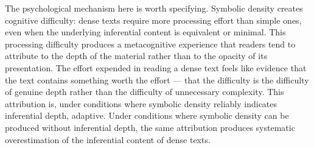 \documentclass[12pt, openright, twoside]{book}
\begin{document}
The psychological mechanism here is worth specifying. Symbolic density
creates cognitive difficulty: dense texts require more processing effort
than simple ones, even when the underlying inferential content is
equivalent or minimal. This processing difficulty produces a metacognitive
experience that readers tend to attribute to the depth of the material
rather than to the opacity of its presentation. The effort expended
in reading a dense text feels like evidence that the text contains
something worth the effort --- that the difficulty is the difficulty
of genuine depth rather than the difficulty of unnecessary complexity.
This attribution is, under conditions where symbolic density reliably
indicates inferential depth, adaptive. Under conditions where symbolic
density can be produced without inferential depth, the same attribution
produces systematic overestimation of the inferential content of dense
texts.
\end{document}
